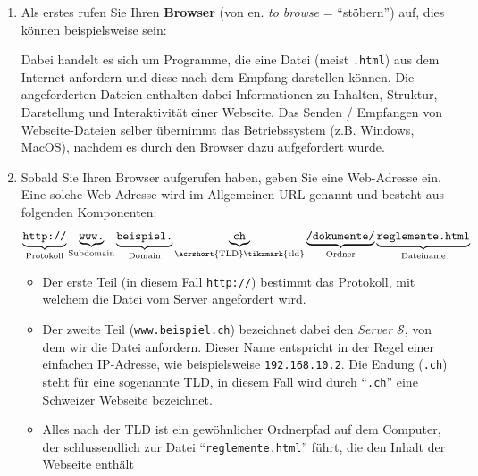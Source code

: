 \begin{enumerate}
	\item Als erstes rufen Sie Ihren \textbf{Browser} (von en. \textit{to browse} = \enquote{stöbern}) auf, dies können beispielsweise sein:
	      Dabei handelt es sich um Programme, die eine Datei (meist \texttt{.html}) aus dem Internet anfordern und diese nach dem Empfang darstellen können.  Die angeforderten Dateien enthalten dabei Informationen zu Inhalten, Struktur, Darstellung und Interaktivität einer Webseite. Das Senden / Empfangen von Webseite-Dateien selber übernimmt das Betriebssystem (z.B. Windows, MacOS), nachdem es durch den Browser dazu aufgefordert wurde.
	\item Sobald Sie Ihren Browser aufgerufen haben, geben Sie eine Web-Adresse ein. Eine solche Web-Adresse wird im Allgemeinen \gls{URL} genannt und besteht aus folgenden Komponenten:
	      \[
		      \underbrace{\text{\texttt{http://}}}_{\text{Protokoll}}
		      \underbrace{\text{\texttt{www.}}}_{\text{Subdomain}}
		      \underbrace{\text{\texttt{beispiel.}}}_{\text{Domain}}
		      \underbrace{\text{\texttt{ch}}}_{\text{\acrshort{TLD}\tikzmark{tld}}}
		      \underbrace{\text{\texttt{/dokumente/}}}_{\text{Ordner}}
		      \underbrace{\text{\texttt{reglemente.html}}}_{\text{Dateiname}}
	      \]

	      \begin{itemize}
		      \item Der erste Teil (in diesem Fall \texttt{http://}) bestimmt das Protokoll, mit welchem die Datei vom Server angefordert wird.
		      \item Der zweite Teil (\texttt{www.beispiel.ch}) bezeichnet dabei den \textit{Server} $\mathcal{S}$, von dem wir die Datei anfordern. Dieser Name entspricht in der Regel einer einfachen \gls{IP}-Adresse, wie beispielsweise \texttt{192.168.10.2}. Die Endung (\texttt{.ch}) steht für eine sogenannte \gls{TLD}, in diesem Fall wird durch \enquote{\texttt{.ch}} eine Schweizer Webseite bezeichnet.
		      \item Alles nach der \gls{TLD} ist ein gewöhnlicher Ordnerpfad auf dem Computer, der schlussendlich zur Datei \enquote{\texttt{reglemente.html}} führt, die den Inhalt der Webseite enthält
	      \end{itemize}
\end{enumerate}

